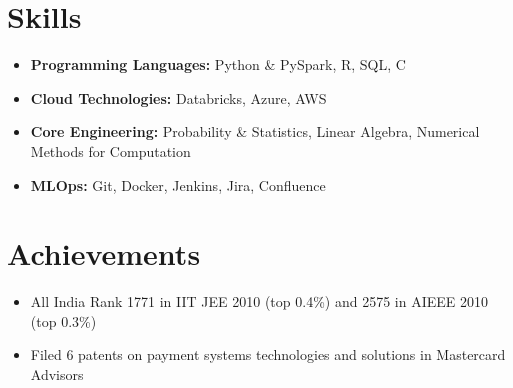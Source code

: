 \documentclass[a4paper,10pt]{article}
\begin{document}
\section*{Skills}
\begin{itemize}[leftmargin=0.2cm, label={}]
    \item \textbf{Programming Languages:} Python \& PySpark, R, SQL, C
    \item \textbf{Cloud Technologies:} Databricks, Azure, AWS
    \item \textbf{Core Engineering:} Probability \& Statistics, Linear Algebra, Numerical Methods for Computation
    \item \textbf{MLOps:} Git, Docker, Jenkins, Jira, Confluence
\end{itemize}

\section*{Achievements}
\begin{itemize}[leftmargin=0.2cm, label={}]
    \item All India Rank 1771 in IIT JEE 2010 (top 0.4\%) and 2575 in AIEEE 2010 (top 0.3\%)
    \item Filed 6 patents on payment systems technologies and solutions in Mastercard Advisors
\end{itemize}
\end{document}
